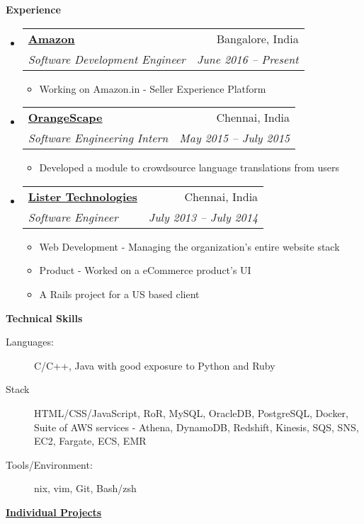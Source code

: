 \documentclass[letterpaper,11pt]{article}
\makeatletter
\newcommand{\resitem}[1]{\item #1 \vspace{-2pt}}
\newcommand{\resheading}[1]{{\large \colorbox{mygrey}{\begin{minipage}{\textwidth}{\textbf{#1 \vphantom{p\^{E}}}}\end{minipage}}}}
\newcommand{\ressubheading}[4]{
\begin{tabular*}{6.5in}{l@{\extracolsep{\fill}}r}
		\textbf{#1} & #2 \\
		\textit{#3} & \textit{#4} \\
\end{tabular*}\vspace{-6pt}}
\makeatother
\begin{document}
\resheading{Experience}
	\begin{itemize}
	    \item 
			\ressubheading{\href{http://www.amazon.in/}{Amazon}}{Bangalore, India}
				{Software Development Engineer}{June 2016 -- Present}
				{ \footnotesize
				\begin{itemize}
					\resitem{Working on Amazon.in  - Seller Experience Platform}
				\end{itemize}
				}
		\item 
			\ressubheading{\href{http://www.orangescape.com/}{OrangeScape}}{Chennai, India}
				{Software Engineering Intern}{May 2015 -- July 2015}
				{ \footnotesize
				\begin{itemize}
					\resitem{Developed a module to crowdsource language translations from users}
				\end{itemize}
				}
		\item 
			\ressubheading{\href{http://www.listertechnologies.com/}{Lister Technologies}}{Chennai, India}
				{Software Engineer}{July 2013 -- July 2014}
				{ \footnotesize
				\begin{itemize}
					\resitem{Web Development - Managing the organization's entire website stack}
					\resitem{Product - Worked on a eCommerce product's UI}
					\resitem{A Rails project for a US based client}
				\end{itemize}
				}
	\end{itemize}  %

\resheading{{Technical Skills}}
	\begin{description}
		\item[Languages:] { \footnotesize C/C++, Java with good exposure to Python and Ruby
		}
		\item[Stack] { \footnotesize HTML/CSS/JavaScript, RoR, MySQL, OracleDB, PostgreSQL, Docker, Suite of AWS services - Athena, DynamoDB, Redshift, Kinesis, SQS, SNS, EC2, Fargate, ECS, EMR
		}
		\item[Tools/Environment:] {\footnotesize *nix, vim, Git, Bash/zsh
		}

	\end{description} %

\newpage

\resheading{\href{https://github.com/dtsdwarak/}{Individual Projects}}
\end{document}
